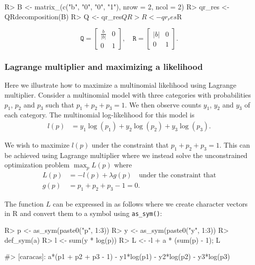 \begin{Schunk}
\begin{Sinput}
R> B <- matrix_(c("b", "0", "0", "1"), nrow = 2, ncol = 2)
R> qr_res <- QRdecomposition(B)
R> Q <- qr_res$Q 
R> R <- qr_res$R
\end{Sinput}
\end{Schunk}

\[
\texttt{Q} = \left[\begin{matrix}\frac{b}{\left|{b}\right|} & 0\\0 & 1\end{matrix}\right], \quad
\texttt{R} = \left[\begin{matrix}\left|{b}\right| & 0\\0 & 1\end{matrix}\right].
\]

\hypertarget{lagrange-multiplier-and-maximizing-a-likelihood}{%
\subsubsection{Lagrange multiplier and maximizing a
likelihood}\label{lagrange-multiplier-and-maximizing-a-likelihood}}

Here we illustrate how to maximize a multinomial likelihood using
Lagrange multiplier. Consider a multinomial model with three categories
with probabilities \(p_1\), \(p_2\) and \(p_3\) such that
\(p_1 + p_2 + p_3 = 1\). We then observe counts \(y_1\), \(y_2\) and
\(y_3\) of each category. The multinomial log-likelihood for this model
is \begin{align}
  l(p) &= y_1 \log(p_1) + y_2 \log(p_2) + y_3 \log(p_3) .
\end{align}

We wish to maximize \(l(p)\) under the constraint that
\(p_1 + p_2 + p_3 = 1\). This can be achieved using Lagrange multiplier
where we instead solve the unconstrained optimization problem
\(\max_p L(p)\) where \begin{align}
  L(p) &= -l(p) + \lambda g(p) \quad \text{under the constraint that} \\
  g(p) &= p_1 + p_2 + p_3 - 1 = 0.
\end{align}

The function \(L\) can be expressed in  as follows
where we create character vectors in R and convert them to a
 symbol using \texttt{as\_sym()}:

\begin{Schunk}
\begin{Sinput}
R> p <- as_sym(paste0("p", 1:3))
R> y <- as_sym(paste0("y", 1:3))
R> def_sym(a) 
R> l <- sum(y * log(p))
R> L <- -l + a * (sum(p) - 1); L
\end{Sinput}
\begin{Soutput}
#> [caracas]: a*(p1 + p2 + p3 - 1) - y1*log(p1) - y2*log(p2) - y3*log(p3)
\end{Soutput}
\end{Schunk}


